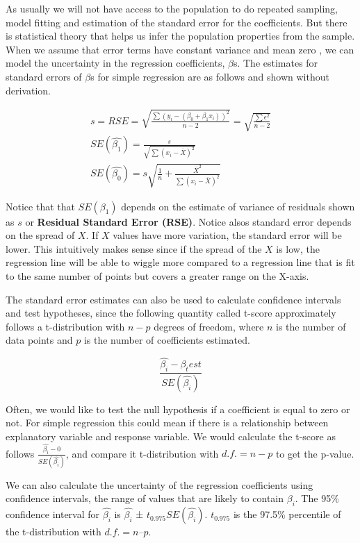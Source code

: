 \documentclass[12pt,]{krantz}
\begin{document}
As usually we will not have access to the population to do repeated sampling,
model fitting and estimation of the standard error for the coefficients. But
there is statistical theory that helps us infer the population properties from
the sample. When we assume that error terms have constant variance and mean zero
, we can model the uncertainty in the regression coefficients, \(\beta\)s.
The estimates for standard errors of \(\beta\)s for simple regression are as
follows and shown without derivation.

\[
\begin{aligned}
s=RSE=\sqrt{\frac{\sum{(y_i-(\beta_0+\beta_1x_i))^2}}{n-2}  } =\sqrt{\frac{\sum{\epsilon^2}}{n-2}  } \\
SE(\hat{\beta_1})=\frac{s}{\sqrt{\sum{(x_i-\overline{X})^2}}} \\
SE(\hat{\beta_0})=s\sqrt{ \frac{1}{n} + \frac{\overline{X}^2}{\sum{(x_i-\overline{X})^2} }  }
\end{aligned}
\]

Notice that that \(SE(\beta_1)\) depends on the estimate of variance of
residuals shown as \(s\) or \textbf{Residual Standard Error (RSE)}.
Notice alsos standard error depends on the spread of \(X\). If \(X\) values have more
variation, the standard error will be lower. This intuitively makes sense since if the
spread of the \(X\) is low, the regression line will be able to wiggle more
compared to a regression line that is fit to the same number of points but
covers a greater range on the X-axis.

The standard error estimates can also be used to calculate confidence intervals and test
hypotheses, since the following quantity called t-score approximately follows a
t-distribution with \(n-p\) degrees of freedom, where \(n\) is the number
of data points and \(p\) is the number of coefficients estimated.

\[ \frac{\hat{\beta_i}-\beta_test}{SE(\hat{\beta_i})}\]

Often, we would like to test the null hypothesis if a coefficient is equal to
zero or not. For simple regression this could mean if there is a relationship
between explanatory variable and response variable. We would calculate the
t-score as follows \(\frac{\hat{\beta_i}-0}{SE(\hat{\beta_i})}\), and compare it
t-distribution with \(d.f.=n-p\) to get the p-value.

We can also
calculate the uncertainty of the regression coefficients using confidence
intervals, the range of values that are likely to contain \(\beta_i\). The 95\%
confidence interval for \(\hat{\beta_i}\) is
\(\hat{\beta_i}\) ± \(t_{0.975}SE(\hat{\beta_i})\).
\(t_{0.975}\) is the 97.5\% percentile of
the t-distribution with \(d.f. = n – p\).
\end{document}

